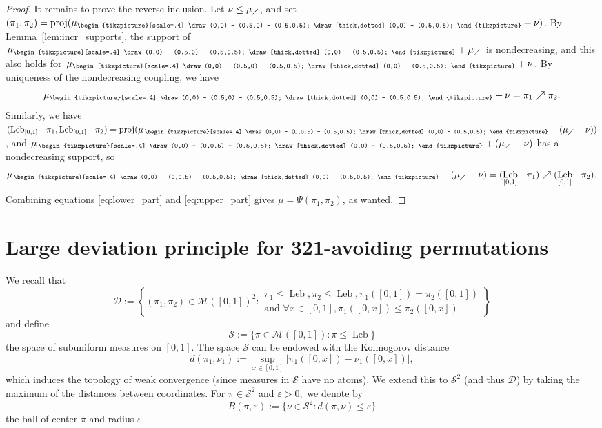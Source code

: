 \documentclass[a4paper,11pt]{amsart}
\DeclareMathOperator{\Leb}{Leb}
\DeclareMathOperator{\proj}{proj}
\theoremstyle{definition}
\newcommand{\lrtriangle}{{\begin{tikzpicture}[scale=.4]
  \draw (0,0) -- (0.5,0) -- (0.5,0.5);
  \draw[thick,dotted] (0,0) -- (0.5,0.5);
\end{tikzpicture}}}
\newcommand{\ultriangle}{{\, \begin{tikzpicture}[scale=.4]
  \draw (0,0) -- (0,0.5) -- (0.5,0.5);
  \draw[thick,dotted] (0,0) -- (0.5,0.5);
\end{tikzpicture}}}
\begin{document}
\begin{proof}
    It remains to prove the reverse inclusion. 
    Let $\nu \le \mu_{\diagup}$, and set $(\pi_1,\pi_2)=\proj(\mu_{\lrtriangle} + \nu)$. 
    By Lemma~\ref{lem:incr_supports}, the support of $\mu_{\lrtriangle} + \mu_{\diagup}$ is nondecreasing, and this also holds for $\mu_{\lrtriangle} + \nu$. 
    By uniqueness of the nondecreasing coupling, we have
    \begin{equation}\label{eq:lower_part}
        \mu_{\lrtriangle} + \nu=\pi_1 \nearrow \pi_2.
   \end{equation}
    Similarly, we have $(\Leb_{[0,1]}-\pi_1,\Leb_{[0,1]}-\pi_2)=\proj(\mu_{\ultriangle} + (\mu_{\diagup}-\nu))$, and $\mu_{\ultriangle} + (\mu_{\diagup}-\nu)$ has a nondecreasing support, so
    \begin{equation}\label{eq:upper_part}
        \mu_{\ultriangle} + (\mu_{\diagup}-\nu)=(\Leb_{[0,1]}-\pi_1) \nearrow (\Leb_{[0,1]}-\pi_2).
   \end{equation}
   Combining equations \eqref{eq:lower_part} and \eqref{eq:upper_part} gives $\mu=\Psi(\pi_1,\pi_2)$, as wanted.
\end{proof}


\section{Large deviation principle for 321-avoiding permutations}

We recall that
\[
\mathcal D := \left\{ (\pi_1, \pi_2) \in \mathcal M([0,1])^2 :
\begin{array}{ll} \pi_1 \leq \Leb, \pi_2 \leq \Leb,
\pi_1([0,1]) = \pi_2([0,1])\\ \text{and }\forall x\in [0,1], \pi_1([0,x]) \le \pi_2([0,x])
\end{array}\right\}
\]
and define
\[
\mathcal S := \{ \pi \in \mathcal M([0,1]) : \pi \leq \Leb\} 
\]
the space of subuniform measures on $[0,1]$. 
The space $\mathcal S$ can be endowed with the Kolmogorov distance
\[ d(\pi_1, \nu_1) := \sup_{x\in [0,1]} |\pi_1([0,x]) - \nu_1([0,x])|,\]
which induces the topology of weak convergence (since measures in $\mathcal S$ have no atoms).
We extend this to $\mathcal S^2$ (and thus $\mathcal D$) by taking the maximum of the distances between coordinates.
For $\pi \in \mathcal S^2$ and $\varepsilon >0,$ we denote by
\[ B(\pi, \varepsilon) := \{ \nu \in \mathcal S^2 : d(\pi, \nu) \le \varepsilon\}\]
the ball of center $\pi$ and radius $\varepsilon.$
\end{document}
